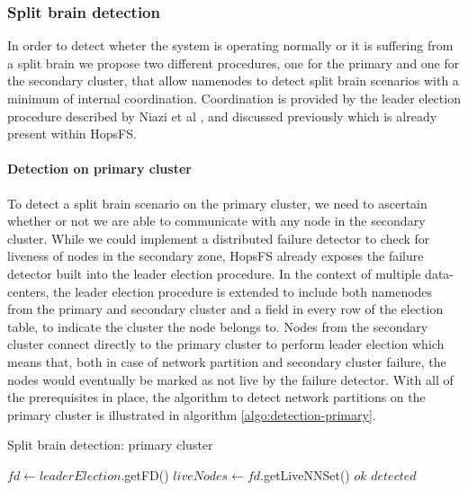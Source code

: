 \subsubsection{Split brain detection}
In order to detect wheter the system is operating normally or it is suffering from a split brain we propose two different procedures, one for the primary and one for the secondary cluster, that allow namenodes to detect split brain scenarios with a minimum of internal coordination.
Coordination is provided by the leader election procedure described by Niazi et al \cite{DBLP:conf/fast/NiaziIHDGR17}, and discussed previously which is already present within HopsFS.

\paragraph{Detection on primary cluster}

To detect a split brain scenario on the primary cluster, we need to ascertain whether or not we are able to communicate with any node in the secondary cluster.
While we could implement a distributed failure detector to check for liveness of nodes in the secondary zone, HopsFS already exposes the failure detector built into the leader election procedure.
In the context of multiple data-centers, the leader election procedure is extended to include both namenodes from the primary and secondary cluster and a field in every row of the election table, to indicate the cluster the node belongs to.
Nodes from the secondary cluster connect directly to the primary cluster to perform leader election which means that, both in case of network partition and secondary cluster failure, the nodes would eventually be marked as not live by the failure detector.
With all of the prerequisites in place, the algorithm to detect network partitions on the primary cluster is illustrated in algorithm \ref{algo:detection-primary}.

\begin{algorithm}[!ht]
	\begin{algorithmic}[1]
  		\caption{Split brain detection: primary cluster}
  		\label{algo:detection-primary}
  		\State $fd \leftarrow leaderElection$.getFD()
		\State $liveNodes \leftarrow fd$.getLiveNNSet()
		        \State \Return $ok$
		    \EndIf
		\EndFor
		\State \Return $detected$
  	\end{algorithmic}
\end{algorithm}

